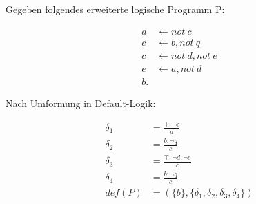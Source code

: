 Gegeben folgendes erweiterte logische Programm P:

\begin{align*}
a &\leftarrow not\ c\\
c &\leftarrow b, not\ q\\
c &\leftarrow not\ d, not\ e\\
e &\leftarrow a, not\ d\\
b.
\end{align*}

Nach Umformung in Default-Logik:

\begin{align*}
\delta_1 &= \frac{\top:\neg{c}}{a}\\
\delta_2 &= \frac{b:\neg{q}}{c}\\
\delta_3 &= \frac{\top:\neg{d}, \neg{e}}{c}\\
\delta_4 &= \frac{b:\neg{q}}{c}\\
def(P) &= (\{b\},\{\delta_1,\delta_2,\delta_3,\delta_4\})
\end{align*}